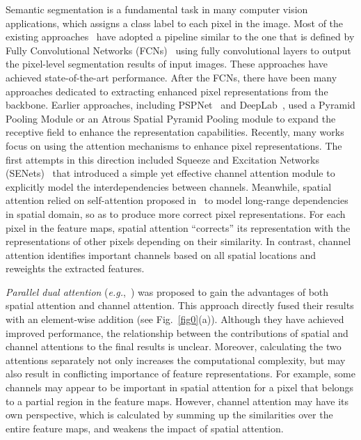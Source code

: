 \documentclass[letterpaper]{article} \usepackage{aaai22}  \usepackage{times}  \usepackage{helvet}  \usepackage{courier}  \usepackage[hyphens]{url}  \usepackage{graphicx} \urlstyle{rm} \def\UrlFont{\rm}  \usepackage{natbib}  \usepackage{caption} \DeclareCaptionStyle{ruled}{labelfont=normalfont,labelsep=colon,strut=off} \frenchspacing  \setlength{\pdfpagewidth}{8.5in}  \setlength{\pdfpageheight}{11in}  \usepackage{algorithm}
\begin{document}
Semantic segmentation is a fundamental task in many computer vision applications, which assigns a class label to each pixel in the image. 
Most of the existing approaches~\cite{cOCR,cDenseASPP,cDualAttention,cEMANet} have adopted a pipeline similar to the one that is defined by Fully Convolutional Networks (FCNs)~\cite{cFCN} using fully convolutional layers to output the pixel-level segmentation results of input images. These approaches have achieved state-of-the-art performance. 
After the FCNs,
there have been many approaches dedicated to extracting enhanced pixel representations from the backbone. 
Earlier approaches, including PSPNet~\cite{cPSPNet} and DeepLab~\cite{cDeepLabV3Plus}, used a Pyramid Pooling Module or an Atrous Spatial Pyramid Pooling module to expand the receptive field to enhance the representation capabilities. Recently, many works focus on using the attention mechanisms to enhance pixel representations. 
The first attempts in this direction included Squeeze and Excitation Networks (SENets)~\cite{cSENet} that introduced a simple yet effective channel attention module to explicitly model the interdependencies between channels. 
Meanwhile, spatial attention relied on self-attention proposed in~\cite{cNonLocal, cAttentionIsAllYourNeed} to model long-range dependencies in spatial domain, so as to produce more correct pixel representations.
For each pixel in the feature maps, spatial attention ``corrects'' its representation with the representations of other pixels depending on their similarity.
In contrast, channel attention identifies important channels based on all spatial locations and reweights the extracted features.

\textit{Parallel dual attention} (\textit{e.g.},~\cite{cDualAttention}) was proposed to gain the advantages of both spatial attention and channel attention. This approach directly fused their results with an element-wise addition (see Fig.~\ref{fig0}(a)). 
Although they have achieved improved performance, the relationship between the contributions of spatial and channel attentions to the final results is unclear.
Moreover, calculating the two attentions separately not only increases the computational complexity, but may also result in conflicting importance of feature representations. 
For example, some channels may appear to be important in spatial attention for a pixel that belongs to a partial region in the feature maps. However, channel attention may have its own perspective, which is calculated by summing up the similarities over the entire feature maps, and weakens the impact of spatial attention. 
\end{document}
